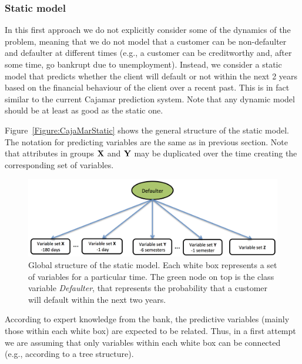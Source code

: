 \subsubsection*{Static model} 

In this first approach we do not explicitly consider some of the dynamics of the problem, meaning that we do not model that a customer can be non-defaulter and defaulter at different times (e.g., a customer can be creditworthy and, after some time, go bankrupt due to unemployment). Instead, we consider a static model that predicts whether the client will default or not within the next 2 years based on the financial behaviour of the client over a recent past. This is in fact similar to the current Cajamar prediction system. Note that any dynamic model should be at least as good as the static one. 

Figure~\ref{Figure:CajaMarStatic} shows the general structure of the static model. The notation for predicting variables are the same as in previous section. Note that attributes in groups $\mathbf{X}$ and $\mathbf{Y}$ may be duplicated over the time creating the corresponding set of variables. 

\begin{figure}[ht!]
  \centering
\includegraphics[scale=0.5]{./figures/CajaMarModel0}
\caption{\label{Figure:CajaMarStatic}Global structure of the static model. Each white box represents a set of variables for a particular time. The green node on top is the class variable \emph{Defaulter}, that represents the probability that a customer will default within the next two years. } 
\label{fig:CajamarStaticModel}
\end{figure}

According to expert knowledge from the bank, the predictive variables (mainly those within each white box) are expected to be related. Thus, in a first attempt we are assuming that only variables within each white box can be connected (e.g., according to a tree structure).

